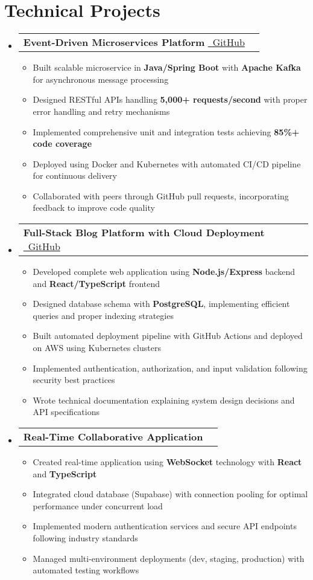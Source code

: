 \documentclass[letterpaper,10pt]{article}
\makeatletter
\newcommand{\resumeItem}[1]{
  \item\small{#1 \vspace{-2pt}}
}
\newcommand{\resumeProjectHeading}[2]{
    \item[]
    \begin{tabular*}{\textwidth}{l@{\extracolsep{\fill}}r}
      \small#1 & {\small #2}
    \end{tabular*}\vspace{-7pt}
}
\newcommand{\resumeSubHeadingListStart}{\begin{itemize}[leftmargin=0in, label={}]}
\newcommand{\resumeSubHeadingListEnd}{\end{itemize}\vspace{-5pt}}
\newcommand{\resumeItemListStart}{\begin{itemize}[leftmargin=0.2in, rightmargin=0in]}
\newcommand{\resumeItemListEnd}{\end{itemize}\vspace{-2pt}}
\makeatother
\begin{document}
\section{Technical Projects}
\resumeSubHeadingListStart

\resumeProjectHeading
  {\textbf{Event-Driven Microservices Platform} \href{https://github.com/Anurag-xo/EmailNotification-microservice}{\faGithub\ GitHub}}{}
  \resumeItemListStart
    \resumeItem{Built scalable microservice in \textbf{Java/Spring Boot} with \textbf{Apache Kafka} for asynchronous message processing}
    \resumeItem{Designed RESTful APIs handling \textbf{5,000+ requests/second} with proper error handling and retry mechanisms}
    \resumeItem{Implemented comprehensive unit and integration tests achieving \textbf{85\%+ code coverage}}
    \resumeItem{Deployed using Docker and Kubernetes with automated CI/CD pipeline for continuous delivery}
    \resumeItem{Collaborated with peers through GitHub pull requests, incorporating feedback to improve code quality}
  \resumeItemListEnd
  
\resumeProjectHeading
  {\textbf{Full-Stack Blog Platform with Cloud Deployment} \href{https://github.com/Anurag-xo/Blog-web}{\faGithub\ GitHub}}{}
  \resumeItemListStart
    \resumeItem{Developed complete web application using \textbf{Node.js/Express} backend and \textbf{React/TypeScript} frontend}
    \resumeItem{Designed database schema with \textbf{PostgreSQL}, implementing efficient queries and proper indexing strategies}
    \resumeItem{Built automated deployment pipeline with GitHub Actions and deployed on AWS using Kubernetes clusters}
    \resumeItem{Implemented authentication, authorization, and input validation following security best practices}
    \resumeItem{Wrote technical documentation explaining system design decisions and API specifications}
  \resumeItemListEnd
  
\resumeProjectHeading
  {\textbf{Real-Time Collaborative Application}}{}
  \resumeItemListStart
    \resumeItem{Created real-time application using \textbf{WebSocket} technology with \textbf{React} and \textbf{TypeScript}}
    \resumeItem{Integrated cloud database (Supabase) with connection pooling for optimal performance under concurrent load}
    \resumeItem{Implemented modern authentication services and secure API endpoints following industry standards}
    \resumeItem{Managed multi-environment deployments (dev, staging, production) with automated testing workflows}
  \resumeItemListEnd

\resumeSubHeadingListEnd
\end{document}
